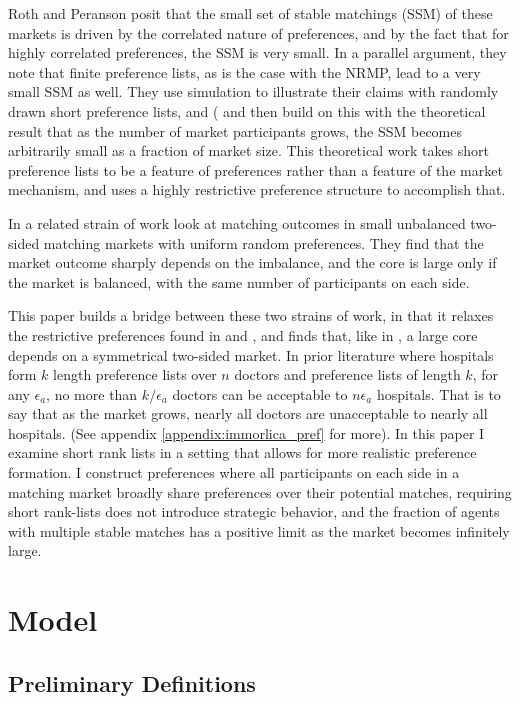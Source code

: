 \documentclass[WP]{AEA}
\begin{document}
 
Roth and Peranson posit that the small set of stable matchings (SSM) of these markets is driven by the correlated nature of preferences, and by the fact that for highly correlated preferences, the SSM is very small.  In a parallel argument, they note that finite preference lists, as is the case with the NRMP, lead to a very small SSM as well.  They use simulation to illustrate their claims with randomly drawn short preference lists, and (\cite{Immorlica2005} and then \cite{Kojima2009} build on this with the theoretical result that as the number of market participants grows, the SSM becomes arbitrarily small as a fraction of market size. This theoretical work takes short preference lists to be a feature of preferences rather than a feature of the market mechanism, and uses a highly restrictive preference structure to accomplish that. 

In a related strain of work \cite{Ashlagi2017} look at matching outcomes in small unbalanced two-sided matching markets with uniform random preferences.  They find that the market outcome sharply depends on the imbalance, and the core is large only if the market is balanced, with the same number of participants on each side. 


This paper builds a bridge between these two strains of work, in that it relaxes the restrictive preferences found in \cite{Immorlica2005} and  \cite{Kojima2009}, and finds that, like in \cite{Ashlagi2017}, a large core depends on a symmetrical two-sided market. In prior literature where hospitals form $k$ length preference lists over $n$ doctors and preference lists of length $k$,  for any $\epsilon_a$, no more than $k/\epsilon_a$ doctors can be acceptable to $n\epsilon_a$ hospitals. That is to say that as the market grows, nearly all doctors are unacceptable to nearly all hospitals. (See appendix \ref{appendix:immorlica_pref} for more).  
In this paper I examine short rank lists in a setting that allows for more realistic preference formation. I construct preferences where all participants on each side in a matching market broadly share preferences over their potential matches, requiring short rank-lists does not introduce strategic behavior, and the fraction of agents with multiple stable matches has a positive limit as the market becomes infinitely large.


\section{Model}
\subsection{Preliminary Definitions}
\end{document}
